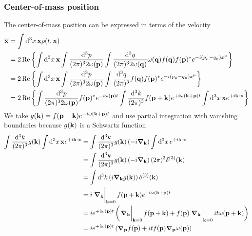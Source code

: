 \subsubsection{Center-of-mass position}

The center-of-mass position can be expressed in terms of the velocity
\begin{equation}
	\begin{split}
		\overline{\vb{x}}
		&=
		\int\dd[3]{x}
		\vb{x}
		\rho(t,\vb{x})
		\\
		&=
		2\Re\left\{
			\int\dd[3]{x}
			\vb{x}
			\int\frac{\dd[3]{p}}{(2\pi)^32\omega(\vb{p})}
			\int\frac{\dd[3]{q}}{(2\pi)^32\omega(\vb{q})}
			\omega(\vb{q})
			f(\vb{q})
			f(\vb{p})^*
			e^{-i(p_\mu-q_\mu)x^\mu}
		\right\}
		\\
		&=
		2\Re\left\{
			\int\dd[3]{x}
			\vb{x}
			\int\frac{\dd[3]{p}}{(2\pi)^32\omega(\vb{p})}
			\int\frac{\dd[3]{q}}{(2\pi)^3}
			f(\vb{q})
			f(\vb{p})^*
			e^{-i(p_\mu-q_\mu)x^\mu}
		\right\}
		\\
		&=
		2\Re\left\{
			\int\frac{\dd[3]{p}}{(2\pi)^32\omega(\vb{p})}
			f(\vb{p})^*
			e^{-i\omega(\vb{p})t}
			\int\frac{\dd[3]{k}}{(2\pi)^3}
			f(\vb{p}+\vb{k})
			e^{+i\omega(\vb{k}+\vb{p})t}
			\int\dd[3]{x}
			\vb{x}
			e^{+i\vb{k}\vdot\vb{x}}
		\right\}
	\end{split}
\end{equation}
We take $g(\vb{k})=f(\vb{p}+\vb{k})e^{-i\omega(\vb{k}+\vb{p})t}$ and use partial integration with vanishing boundaries because $g(\vb{k})$ is a Schwartz function
\begin{equation}
	\begin{split}
		\int\frac{\dd[3]{k}}{(2\pi)^3}
		g(\vb{k})
		\int\dd[3]{x}
		\vb{x}
		e^{+i\vb{k}\vdot\vb{x}}
		&=
		\int\frac{\dd[3]{k}}{(2\pi)^3}
		g(\vb{k})
		\left(-i\grad_{\vb{k}}\right)
		\int\dd[3]{x}
		e^{+i\vb{k}\vdot\vb{x}}
		\\
		&=
		\int\frac{\dd[3]{k}}{(2\pi)^3}
		g(\vb{k})
		\left(-i\grad_{\vb{k}}\right)
		(2\pi)^3\delta^{(3)}(\vb{k})
		\\
		&=
		\int\dd[3]{k}
		\left(i\grad_{\vb{k}}g(\vb{k})\right)
		\delta^{(3)}(\vb{k})
		\\
		&=
		i\eval{\grad_{\vb{k}}}_{\vb{k}=0}
		f(\vb{p}+\vb{k})
		e^{+i\omega(\vb{k}+\vb{p})t}
		\\
		&=
		ie^{+i\omega(\vb{p})t}
		\left(
			\eval{\grad_{\vb{k}}}_{\vb{k}=0}
			f(\vb{p}+\vb{k})
			+
			f(\vb{p})
			\eval{\grad_{\vb{k}}}_{\vb{k}=0}
			it\omega(\vb{p}+\vb{k})
		\right)
		\\
		&=
		ie^{+i\omega(\vb{p})t}
		\left(
			\grad_{\vb{p}}
			f(\vb{p})
			+
			it
			f(\vb{p})
			\grad_{\vb{p}}
			\omega(\vb{p})
		\right)
	\end{split}
\end{equation}
